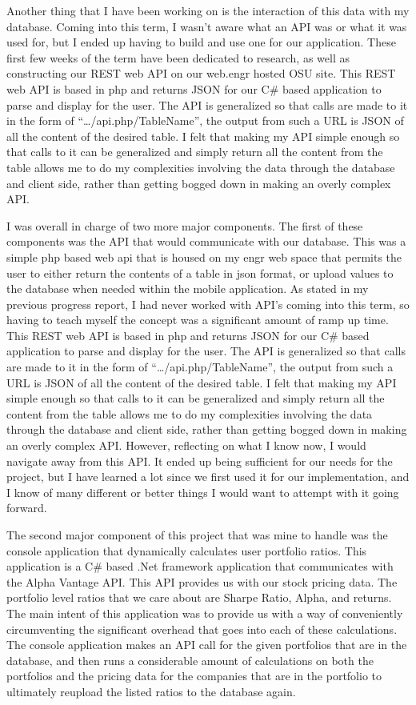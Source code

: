 \documentclass[letterpaper,10pt,titlepage,journal,compsoc,draftclsnofoot,onecolumn]{IEEEtran}
\begin{document}
Another thing that I have been working on is the interaction of this data with my database. Coming into this term, I wasn’t aware what an API was or what it was used for, but I ended up having to build and use one for our application. These first few weeks of the term have been dedicated to research, as well as constructing our REST web API on our web.engr hosted OSU site. This REST web API is based in php and returns JSON for our C\# based application to parse and display for the user.  The API is generalized so that calls are made to it in the form of “…/api.php/{TableName}”, the output from such a URL is JSON of all the content of the desired table. I felt that making my API simple enough so that calls to it can be generalized and simply return all the content from the table allows me to do my complexities involving the data  through the database and client side, rather than getting bogged down in making an overly complex API. 

I was overall in charge of two more major components. The first of these components was the API that would communicate with our database. This was a simple php based web api that is housed on my engr web space that permits the user to either return the contents of a table in json format, or upload values to the database when needed within the mobile application. As stated in my previous progress report, I had never worked with API's coming into this term, so having to teach myself the concept was a significant amount of ramp up time. This REST web API is based in php and returns JSON for our C\# based application to parse and display for the user.  The API is generalized so that calls are made to it in the form of “…/api.php/{TableName}”, the output from such a URL is JSON of all the content of the desired table. I felt that making my API simple enough so that calls to it can be generalized and simply return all the content from the table allows me to do my complexities involving the data  through the database and client side, rather than getting bogged down in making an overly complex API. However, reflecting on what I know now, I would navigate away from this API. It ended up being sufficient for our needs for the project, but I have learned a lot since we first used it for our implementation, and I know of many different or better things I would want to attempt with it going forward.

The second major component of this project that was mine to handle was the console application that dynamically calculates user portfolio ratios. This application is a C\# based .Net framework application that communicates with the Alpha Vantage API. This API provides us with our stock pricing data. The portfolio level ratios that we care about are Sharpe Ratio, Alpha, and returns. The main intent of this application was to provide us with a way of conveniently circumventing the significant overhead that goes into each of these calculations. The console application makes an API call for the given portfolios that are in the database, and then runs a considerable amount of calculations on both the portfolios and the pricing data for the companies that are in the portfolio to ultimately reupload the listed ratios to the database again. 
\end{document}
